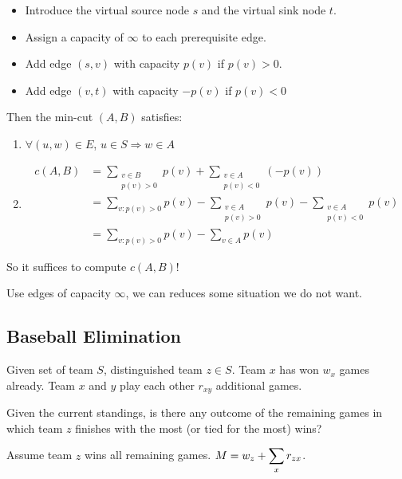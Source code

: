 
    \begin{itemize}
        \item Introduce the virtual source node  $ s $ and the virtual sink node  $ t $.
        \item Assign a capacity of  $ \infty $ to each prerequisite edge.
        \item Add edge  $ (s,v) $ with capacity  $ p(v) $ if  $ p(v)>0 $.
        \item Add edge  $ (v,t) $ with capacity  $ -p(v) $ if  $ p(v)<0 $ 
    \end{itemize}

    Then the min-cut $ (A,B)  $ satisfies:
    \begin{enumerate}[label=\arabic*)]
        \item  $ \forall (u,w)\in E  $,  $ u\in S\Rightarrow w\in A $ 
        \item \begin{align*}
            c(A,B)&=\sum_{\substack{v\in B\\p(v)>0}}p(v)+\sum_{\substack{v\in A\\p(v)<0}}(-p(v))\\
            &=\sum_{v:p(v)>0}p(v)-\sum_{\substack{v\in A\\p(v)>0}}p(v)-\sum_{\substack{v\in A\\p(v)<0}}p(v)\\
            &=\sum_{v:p(v)>0}p(v)-\sum_{v\in A}p(v)
        \end{align*}
    \end{enumerate}

    So it suffices to compute  $ c(A,B) $!

    \begin{remark}
        Use edges of capacity $ \infty $, we can reduces some situation we do not want.
    \end{remark}

    \subsection{Baseball Elimination}
    \begin{example}
        Given set of team  $ S $, distinguished team  $ z\in S $. Team  $ x  $ has won  $ w_x  $ games already. Team  $ x  $ and  $ y  $ play each other  $ r_{xy} $  additional games.

        Given the current standings, is there any outcome of the remaining games in which team  $ z $ finishes with the most (or tied for the most) wins?
    \end{example}
    Assume team  $ z  $ wins all remaining games.  $ M=w_z+\displaystyle\sum_{x}r_{zx} $.

